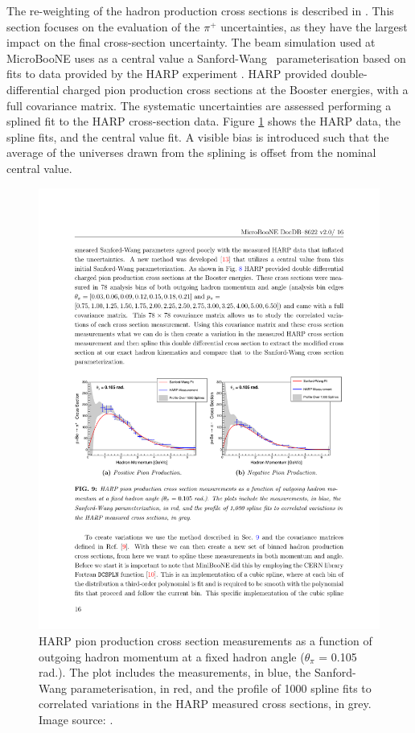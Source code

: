 The re-weighting of the hadron production cross sections is described in \cite{miniboone_flux, flux_note}. This section focuses on the evaluation of the $\pi^+$ uncertainties, as they have the largest impact on the final cross-section uncertainty. The beam simulation used at MicroBooNE uses as a central value a Sanford-Wang~\cite{miniboone_flux} parameterisation based on fits to data provided by the HARP experiment \cite{schmitz}. HARP provided double-differential charged pion production cross sections at the Booster energies, with a full covariance matrix. The systematic uncertainties are assessed performing a splined fit to the HARP cross-section data. Figure \ref{fig:harp_fit} shows the HARP data, the spline fits, and the central value fit. A visible bias is introduced such that the average of the universes drawn from the splining is offset from the nominal central value. 
\begin{figure}[]
\centering
\includegraphics[width=.70\textwidth]{images/harp_fit}
\caption[HARP Pion Production Cross Section Measurements]{HARP pion production cross section measurements as a function of outgoing hadron momentum at a fixed hadron angle ($\theta_\pi$ = 0.105 rad.). The plot includes the measurements, in blue, the Sanford-Wang parameterisation, in red, and the profile of 1000 spline fits to correlated variations in the HARP measured cross sections, in grey. Image source: \cite{flux_technote}.}
\label{fig:harp_fit}
\end{figure}
